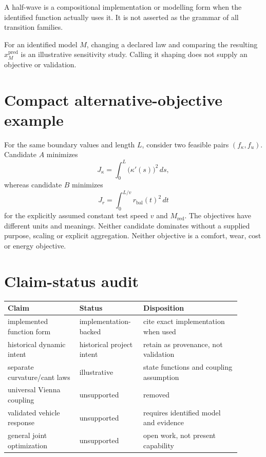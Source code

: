 \begin{definition}
\label{def:half-wave-interpretation}
A half-wave is a compositional implementation or modelling form when the
identified function actually uses it. It is not asserted as the grammar of
all transition families.
\end{definition}

\begin{definition}
\label{def:dynamic-state-shaping}
For an identified model \(M\), changing a declared law and comparing the
resulting \(x_M^{\mathrm{pred}}\) is an illustrative sensitivity study.
Calling it shaping does not supply an objective or validation.
\end{definition}

\section{Compact alternative-objective example}

For the same boundary values and length \(L\), consider two feasible pairs
\((f_\kappa,f_u)\). Candidate \(A\) minimizes
\[
J_\kappa=\int_0^L \bigl(\kappa'(s)\bigr)^2\,ds,
\]
whereas candidate \(B\) minimizes
\[
J_r=\int_0^{L/v} r_{\mathrm{bal}}(t)^2\,dt
\]
for the explicitly assumed constant test speed \(v\) and
\(M_{\mathrm{red}}\). The objectives have different units and meanings.
Neither candidate dominates without a supplied purpose, scaling or explicit
aggregation. Neither objective is a comfort, wear, cost or energy objective.

\section{Claim-status audit}

\begin{center}
\small
\begin{tabular}{p{0.29\linewidth}p{0.23\linewidth}p{0.38\linewidth}}
\toprule
Claim & Status & Disposition\\
\midrule
implemented function form & implementation-backed & cite exact implementation when used\\
historical dynamic intent & historical project intent & retain as provenance, not validation\\
separate curvature/cant laws & illustrative & state functions and coupling assumption\\
universal Vienna coupling & unsupported & removed\\
validated vehicle response & unsupported & requires identified model and evidence\\
general joint optimization & unsupported & open work, not present capability\\
\bottomrule
\end{tabular}
\end{center}

